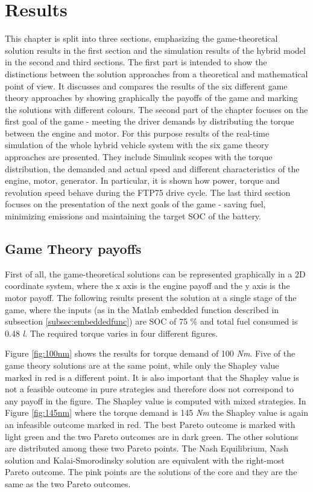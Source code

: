 \chapter{Results}
\label{chp:results}

This chapter is split into three sections, emphasizing the game-theoretical solution results in the first section and the simulation results of the hybrid model in the second and third sections. The first part is intended to show the distinctions between the solution approaches from a theoretical and mathematical point of view. It discusses and compares the results of the six different game theory approaches by showing graphically the payoffs of the game and marking the solutions with different colours. The second part of the chapter focuses on the first goal of the game - meeting the driver demands by distributing the torque between the engine and motor. For this purpose results of the real-time simulation of the whole hybrid vehicle system with the six game theory approaches are presented. They include Simulink scopes with the torque distribution, the demanded and actual speed and different characteristics of the engine, motor, generator. In particular, it is shown how power, torque and revolution speed behave during the FTP75 drive cycle. The last third section focuses on the presentation of the next goals of the game - saving fuel, minimizing emissions and maintaining the target SOC of the battery.

\section{Game Theory payoffs}
First of all, the game-theoretical solutions can be represented graphically in a 2D coordinate system, where the x axis is the engine payoff and the y axis is the motor payoff. The following results present the solution at a single stage of the game, where the inputs (as in the Matlab embedded function described in subsection \ref{subsec:embeddedfunc}) are SOC of 75 \% and total fuel consumed is 0.48 \textit{l}. The required torque varies in four different figures. 

Figure \ref{fig:100nm} shows the results for torque demand of 100 \textit{Nm}. Five of the game theory solutions are at the same point, while only the Shapley value marked in red is a different point. It is also important that the Shapley value is not a feasible outcome in pure strategies and therefore does not correspond to any payoff in the figure. The Shapley value is computed with mixed strategies. In Figure \ref{fig:145nm} where the torque demand is 145 \textit{Nm} the Shapley value is again an infeasible outcome marked in red. The best Pareto outcome is marked with light green and the two Pareto outcomes are in dark green. The other solutions are distributed among these two Pareto points. The Nash Equilibrium, Nash solution and Kalai-Smorodinsky solution are equivalent with the right-most Pareto outcome. The pink points are the solutions of the core and they are the same as the two Pareto outcomes.

